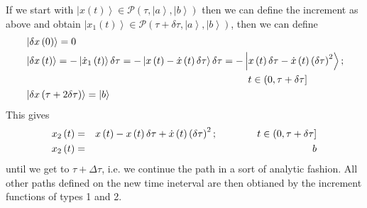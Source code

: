 \documentclass[aps,preprint]{revtex4}
\begin{document}
\begin{enumerate}
\qquad If we start with $\left\vert x\left( t\right) \right\rangle \in 
\mathcal{P}\left( \tau ,\left\vert a\right\rangle ,\left\vert b\right\rangle
\right) $ then we can define the increment as above and obtain $\left\vert
x_{1}\left( t\right) \right\rangle \in \mathcal{P}\left( \tau +\delta \tau
,\left\vert a\right\rangle ,\left\vert b\right\rangle \right) $, then we can
define 
\begin{align}
& \left\vert \delta x\left( 0\right) \right\rangle =0  \notag \\
& \left\vert \delta x\left( t\right) \right\rangle =-\left\vert \dot{x}%
_{1}\left( t\right) \right\rangle \delta \tau =-\left\vert x\left( t\right) -%
\dot{x}\left( t\right) \delta \tau \right\rangle \delta \tau =-\left\vert
x\left( t\right) \delta \tau -\dot{x}\left( t\right) \left( \delta \tau
\right) ^{2}\right\rangle ;  \notag \\
& \left. {}\right. \qquad \qquad \qquad \qquad \qquad \qquad \qquad \qquad
\qquad \qquad \qquad t\in \left( 0,\tau +\delta \tau \right]  \\
& \left\vert \delta x\left( \tau +2\delta \tau \right) \right\rangle
=\left\vert b\right\rangle 
\end{align}%
This gives 
\begin{eqnarray}
x_{2}\left( t\right)  &=&x\left( t\right) -x\left( t\right) \delta \tau +%
\dot{x}\left( t\right) \left( \delta \tau \right) ^{2};\qquad \qquad t\in
\left( 0,\tau +\delta \tau \right]   \notag \\
x_{2}\left( t\right)  &=&b
\end{eqnarray}%
until we get to $\tau +\Delta \tau $, i.e. we continue the path in a sort of
analytic fashion. All other paths defined on the new time ineterval are then
obtianed by the increment functions of types 1 and 2.
\end{enumerate}
\end{document}
